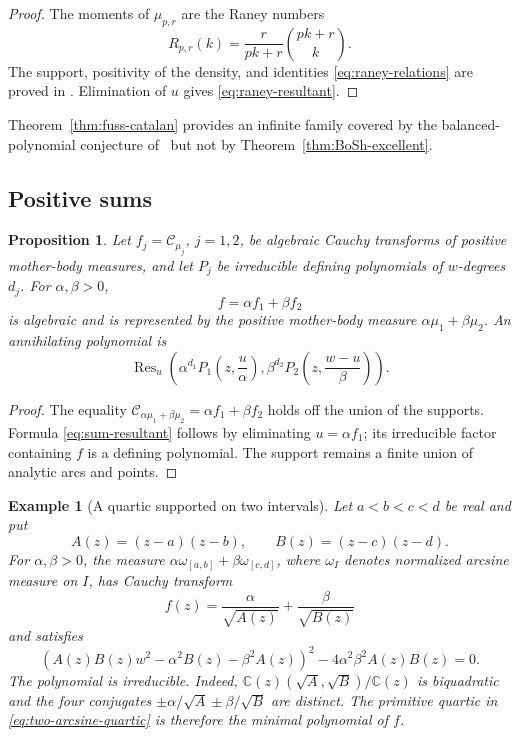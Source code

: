 \documentclass[10pt,a4paper]{amsart}
\newtheorem{proposition}[theorem]{Proposition}
\newtheorem{example}[theorem]{Example}
\newcommand{\bC}{\mathbb C}
\newcommand{\Cauchy}{\mathcal C}
\begin{document}
\begin{proof}
The moments of $\mu_{p,r}$ are the Raney numbers
\[
 R_{p,r}(k)=\frac{r}{pk+r}\binom{pk+r}{k}.
\]
The support, positivity of the density, and identities
\eqref{eq:raney-relations} are proved in
\cite[(2.1), (2.6), and Proposition~2.1]{ForresterLiu}.  Elimination of $u$
gives \eqref{eq:raney-resultant}.
\end{proof}

Theorem~\ref{thm:fuss-catalan} provides an infinite family covered by the
balanced-polynomial conjecture of~\cite{BoSh} but not by
Theorem~\ref{thm:BoSh-excellent}.

\subsection{Positive sums}

\begin{proposition}\label{prop:positive-sums}
Let $f_j=\Cauchy_{\mu_j}$, $j=1,2$, be algebraic Cauchy transforms of positive
mother-body measures, and let $P_j$ be irreducible defining polynomials of
$w$-degrees $d_j$.  For $\alpha,\beta>0$,
\[
 f=\alpha f_1+\beta f_2
\]
is algebraic and is represented by the positive mother-body measure
$\alpha\mu_1+\beta\mu_2$.  An annihilating polynomial is
\begin{equation}\label{eq:sum-resultant}
 \operatorname{Res}_u\left(
 \alpha^{d_1}P_1\left(z,\frac{u}{\alpha}\right),
 \beta^{d_2}P_2\left(z,\frac{w-u}{\beta}\right)
 \right).
\end{equation}
\end{proposition}

\begin{proof}
The equality
$\Cauchy_{\alpha\mu_1+\beta\mu_2}=\alpha f_1+\beta f_2$ holds off the union of
the supports.  Formula \eqref{eq:sum-resultant} follows by eliminating
$u=\alpha f_1$; its irreducible factor containing $f$ is a defining polynomial.
The support remains a finite union of analytic arcs and points.
\end{proof}

\begin{example}[A quartic supported on two intervals]\label{ex:two-arcsine}
Let $a<b<c<d$ be real and put
\[
 A(z)=(z-a)(z-b),\qquad B(z)=(z-c)(z-d).
\]
For $\alpha,\beta>0$, the measure
$\alpha\omega_{[a,b]}+\beta\omega_{[c,d]}$, where $\omega_I$ denotes normalized
arcsine measure on $I$, has Cauchy transform
\[
 f(z)=\frac{\alpha}{\sqrt{A(z)}}+\frac{\beta}{\sqrt{B(z)}}
\]
and satisfies
\begin{equation}\label{eq:two-arcsine-quartic}
 \left( A(z)B(z)w^2-\alpha^2B(z)-\beta^2A(z)\right)^2
 -4\alpha^2\beta^2A(z)B(z)=0.
\end{equation}
The polynomial is irreducible.  Indeed,
$\bC(z)(\sqrt A,\sqrt B)/\bC(z)$ is biquadratic and the four conjugates
$\pm\alpha/\sqrt A\pm\beta/\sqrt B$ are distinct.  The primitive quartic in
\eqref{eq:two-arcsine-quartic} is therefore the minimal polynomial of $f$.
\end{example}
\end{document}
